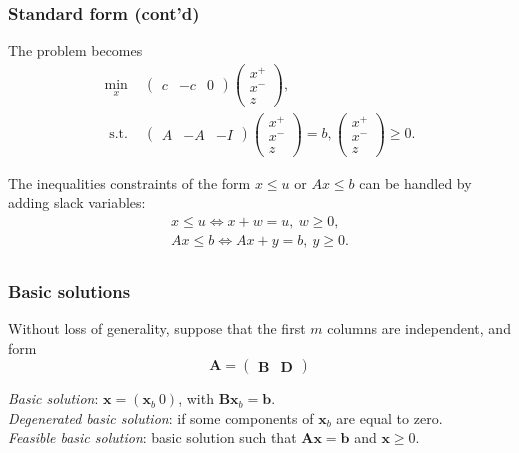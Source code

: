 \documentclass{beamer}
\def\bb{\boldsymbol{b}}
\def\bx{\boldsymbol{x}}
\def\bA{\boldsymbol{A}}
\def\bB{\boldsymbol{B}}
\def\bD{\boldsymbol{D}}
\begin{document}
\begin{frame}
\frametitle{Standard form (cont'd)}

The problem becomes
\begin{align*}
\min_x\ &
\begin{pmatrix}
c & -c & 0
\end{pmatrix}
\begin{pmatrix}
x^+ \\ x^- \\ z
\end{pmatrix}, \\
\mbox{ s.t. } &
\begin{pmatrix}
A & -A & -I
\end{pmatrix}
\begin{pmatrix}
x^+ \\ x^- \\ z
\end{pmatrix} = b,
\begin{pmatrix}
x^+ \\ x^- \\ z
\end{pmatrix} \geq 0.
\end{align*}

The inequalities constraints of the form $x \leq u$ or $Ax \leq b$ can be handled by adding slack variables:
\begin{align*}
x \leq u \Leftrightarrow x+w = u,\ w \geq 0, \\
Ax \leq b \Leftrightarrow Ax + y = b,\ y \geq 0. \\
\end{align*}

\end{frame}

\begin{frame}
	\frametitle{Basic solutions}

Without loss of generality, suppose that the first $m$ columns are independent, and form
	\[
	\bA =
	\begin{pmatrix}
		\bB & \bD
	\end{pmatrix}
	\]
	
	\mbox{}
	
	{\it Basic solution}: $\bx = (\bx_b \ 0)$, with $\bB\bx_b = \bb$.\\
	{\it Degenerated basic solution}: if some components of $\bx_b$ are equal to zero. \\
	{\it Feasible basic solution}: basic solution such that $\bA\bx = \bb$ and $\bx \geq 0$.

\end{frame}
\end{document}
